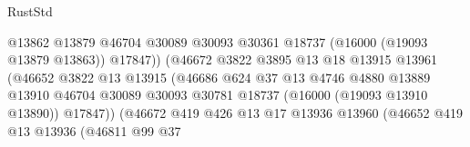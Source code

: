 \begin{lexlean}{RustStd}
\begin{coremodule}
                                              @13862
                                              @13879
                                              @46704
                                              @30089
                                              @30093
                                              @30361
                                              @18737
                                              (@16000 (@19093 @13879 @13863))
                                              @17847))
                                          (@46672
                                            @3822
                                            @3895
                                            @13
                                            @18
                                            @13915
                                            @13961
                                            (@46652
                                              @3822
                                              @13
                                              @13915
                                              (@46686
                                                @624
                                                @37
                                                @13
                                                @4746
                                                @4880
                                                @13889
                                                @13910
                                                @46704
                                                @30089
                                                @30093
                                                @30781
                                                @18737
                                                (@16000 (@19093 @13910 @13890))
                                                @17847))
                                            (@46672
                                              @419
                                              @426
                                              @13
                                              @17
                                              @13936
                                              @13960
                                              (@46652
                                                @419
                                                @13
                                                @13936
                                                (@46811
                                                  @99
                                                  @37

\end{coremodule}
\end{lexlean}
